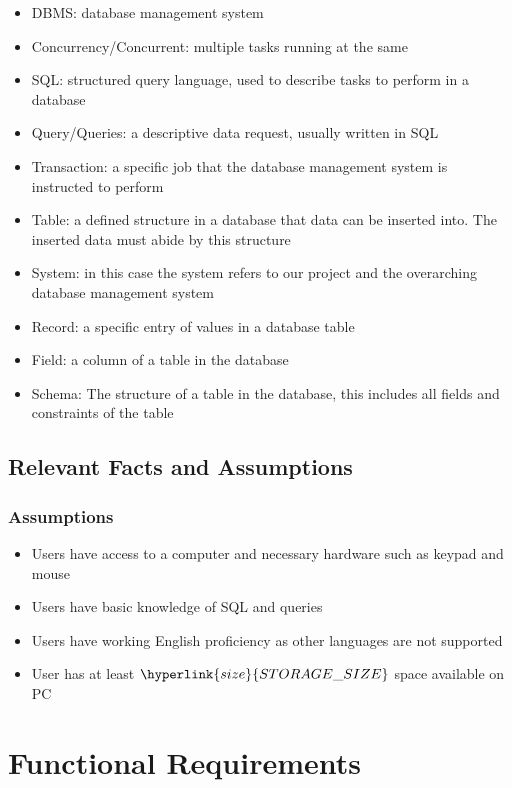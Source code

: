 \documentclass[12pt, titlepage]{article}
\begin{document}
\begin{itemize}
    \item DBMS: database management system
    \item Concurrency/Concurrent: multiple tasks running at the same
    \item SQL: structured query language, used to describe tasks to perform in a database
    \item Query/Queries: a descriptive data request, usually written in SQL
    \item Transaction: a specific job that the database management system is instructed to perform
    \item Table: a defined structure in a database that data can be inserted into. The inserted data must abide by this structure
    \item System: in this case the system refers to our project and the overarching database management system
    \item Record: a specific entry of values in a database table
    \item Field: a column of a table in the database
    \item Schema: The structure of a table in the database, this includes all fields and constraints of the table 
\end{itemize}

\subsection{Relevant Facts and Assumptions}
\subsubsection{Assumptions}
\begin{itemize}
    \item Users have access to a computer and necessary hardware such as keypad and mouse
    \item Users have basic knowledge of SQL and queries
    \item Users have working English proficiency as other languages are not supported
    \item User has at least $\hyperlink{size}{STORAGE\_SIZE}$ space available on PC
\end{itemize}

\section{Functional Requirements}
\end{document}

